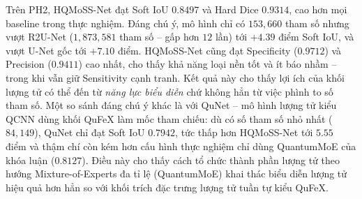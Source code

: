 \begin{table}[h]
\centering
\caption{Kết quả trên PH2 -- các độ đo phân loại điểm ảnh (trung bình $\pm$ độ lệch chuẩn, $5$-fold).}
\label{tab:ph2_pixel}
\end{table}

Trên PH2, HQMoSS-Net đạt Soft IoU $0.8497$ và Hard Dice $0.9314$, cao hơn mọi baseline trong thực nghiệm. Đáng chú ý, mô hình chỉ có $153{,}660$ tham số nhưng vượt R2U-Net ($1{,}873{,}581$ tham số -- gấp hơn $12$ lần) tới $+4.39$ điểm Soft IoU, và vượt U-Net gốc tới $+7.10$ điểm. HQMoSS-Net cũng đạt Specificity ($0.9712$) và Precision ($0.9411$) cao nhất, cho thấy khả năng loại nền tốt và ít báo nhầm -- trong khi vẫn giữ Sensitivity cạnh tranh. Kết quả này cho thấy lợi ích của khối lượng tử có thể đến từ \emph{năng lực biểu diễn} chứ không hẳn từ việc phình to số tham số. Một so sánh đáng chú ý khác là với QuNet -- mô hình lượng tử kiểu QCNN dùng khối QuFeX làm mốc tham chiếu: dù có số tham số nhỏ nhất ($84{,}149$), QuNet chỉ đạt Soft IoU $0.7942$, tức thấp hơn HQMoSS-Net tới $5.55$ điểm và thậm chí còn kém hơn cấu hình thực nghiệm chỉ dùng QuantumMoE của khóa luận ($0.8127$). Điều này cho thấy cách tổ chức thành phần lượng tử theo hướng Mixture-of-Experts đa tỉ lệ (QuantumMoE) khai thác biểu diễn lượng tử hiệu quả hơn hẳn so với khối trích đặc trưng lượng tử tuần tự kiểu QuFeX.

